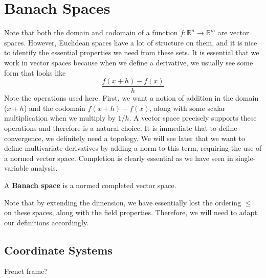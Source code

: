 \section{Banach Spaces}  

  Note that both the domain and codomain of a function $f: \mathbb{R}^n \to \mathbb{R}^m$ are vector spaces. However, Euclidean spaces have a lot of structure on them, and it is nice to identify the essential properties we need from these sets. It is essential that we work in vector spaces because when we define a derivative, we usually see some form that looks like 
  \begin{equation}
    \frac{f(x + h) - f(x)}{h}
  \end{equation} 
  Note the operations used here. First, we want a notion of addition in the domain ($x + h$) and the codomain $f(x + h) - f(x)$, along with some scalar multiplication when we multiply by $1/h$. A vector space precisely supports these operations and therefore is a natural choice. It is immediate that to define convergence, we definitely need a topology. We will see later that we want to define multivariate derivatives by adding a norm to this term, requiring the use of a normed vector space. Completion is clearly essential as we have seen in single-variable analysis. 

  \begin{definition}
    A \textbf{Banach space} is a normed completed vector space. 
  \end{definition}

  Note that by extending the dimension, we have essentially lost the ordering $\leq$ on these spaces, along with the field properties. Therefore, we will need to adapt our definitions accordingly. 

\subsection{Coordinate Systems}  

  Frenet frame? 
